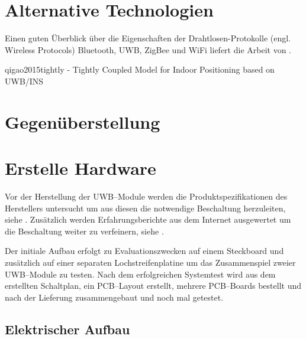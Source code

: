 	

\section{Alternative Technologien}

\begin{comment}
Welche alternativen Technologien gibt es zu UWB?
\end{comment}

Einen guten Überblick über die Eigenschaften der Drahtlosen-Protokolle (engl. Wireless Protocols) Bluetooth, UWB, ZigBee und WiFi liefert die Arbeit \cite{lee2007comparative} von \citeauthor{lee2007comparative}.

qigao2015tightly - Tightly Coupled Model for Indoor Positioning based on UWB/INS



\section{Gegenüberstellung}

\begin{comment}
Welche Eigenschaften haben die alternativen Technologien?
Warum hab ich mich für UWB entschieden?
\end{comment}


\section{Erstelle Hardware}

Vor der Herstellung der UWB--Module werden die Produktspezifikationen des Herstellers untersucht um aus diesen die notwendige Beschaltung herzuleiten, siehe \cite{decawave2016dwm1kdatasheet, decawave2013power}. Zusätzlich werden Erfahrungsberichte aus dem Internet ausgewertet um die Beschaltung weiter zu verfeinern, siehe \cite{Trojer2015, Holder2016, Holder2016a}.

Der initiale Aufbau erfolgt zu Evaluationszwecken auf einem Steckboard und zusätzlich auf einer separaten Lochstreifenplatine um das Zusammenspiel zweier UWB--Module zu testen. Nach dem erfolgreichen Systemtest wird aus dem erstellten Schaltplan, ein PCB--Layout erstellt, mehrere PCB--Boards bestellt und nach der Lieferung zusammengebaut und noch mal getestet.


\subsection{Elektrischer Aufbau}

